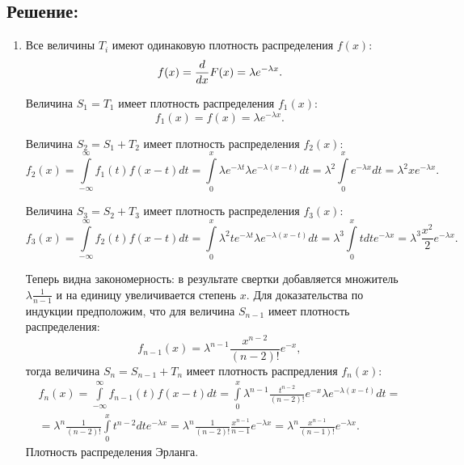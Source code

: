 \documentclass[12pt]{article}
\begin{document}
    \subsection*{Решение:}
    \begin{enumerate}
        \item Все величины $T_i$ имеют одинаковую плотность распределения $f(x)$:
        \[
            f(x) = \frac{d}{d x} F(x) = \lambda e^{-\lambda x} .
        \]

        Величина $S_1 = T_1$ имеет плотность распределения $f_1(x)$:
        \[
            f_1(x) = f(x) = \lambda e^{-\lambda x} .
        \]

        Величина $S_2 = S_1 + T_2$ имеет плотность распределения $f_2(x)$:
        \[
            f_2(x)
            = \int \limits_{-\infty}^{\infty} f_1(t) f(x-t) dt
            = \int \limits_0^x \lambda e^{- \lambda t} \lambda e^{- \lambda (x-t)} dt
            = \lambda^2 \int \limits_0^x e^{- \lambda x} dt
            = \lambda^2 x e^{- \lambda x} .
        \]

        Величина $S_3 = S_2 + T_3$ имеет плотность распределения $f_3(x)$:
        \[
            f_3(x)
            = \int \limits_{-\infty}^{\infty} f_2(t) f(x-t) dt
            = \int \limits_0^x \lambda^2 t e^{- \lambda t} \lambda e^{- \lambda (x-t)} dt
            = \lambda^3 \int \limits_0^x t dt e^{- \lambda x}
            = \lambda^3 \frac{x^2}{2} e^{- \lambda x} .
        \]

        Теперь видна закономерность: в результате свертки добавляется множитель $\lambda \frac{1}{n-1}$ и на единицу увеличивается степень $x$. Для доказательства по индукции предположим, что для величина $S_{n-1}$
        имеет плотность распределения:
        \[
            f_{n-1}(x) = \lambda^{n-1} \frac{x^{n-2}}{(n-2)!} e^{-x} ,
        \]
        тогда величина $S_n = S_{n-1} + T_n$ имеет плотность распредления $f_n(x)$:
        \begin{multline*}
            f_n(x)
            = \int \limits_{-\infty}^{\infty} f_{n-1}(t) f(x-t) dt
            = \int \limits_0^x \lambda^{n-1} \frac{t^{n-2}}{(n-2)!} e^{-x} \lambda e^{- \lambda (x - t )} dt = \\
            = \lambda^n \frac{1}{(n-2)!} \int \limits_0^x t^{n-2} dt e^{- \lambda x}
            = \lambda^n \frac{1}{(n-2)!} \frac{x^{n-1}}{n-1} e^{- \lambda x}
            = \lambda^n \frac{x^{n-1}}{(n-1)!} e^{- \lambda x} .
        \end{multline*}
        Плотность распределения Эрланга.


\end{enumerate}
\end{document}
